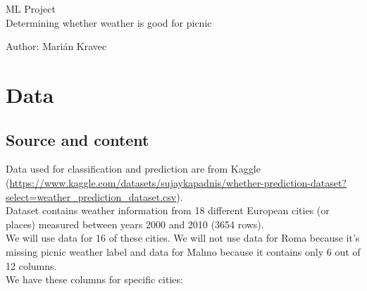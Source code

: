 \documentclass[a4paper]{article}
\begin{document}
 
	
	\pagestyle{plain}
	
	\begin{center}
		\sc\large
		ML Project
		\\
		Determining whether weather is good for picnic 
	\end{center}
	
	Author: Marián Kravec

	\section{Data}
	
	\subsection{Source and content}
	Data used for classification and prediction are from Kaggle (\url{https://www.kaggle.com/datasets/sujaykapadnis/whether-prediction-dataset?select=weather_prediction_dataset.csv}).
	\\
	
	Dataset contains weather information from 18 different European cities (or places) measured between years 2000 and 2010 (3654 rows).
	\\
	
	We will use data for 16 of these cities. We will not use data for Roma because it's missing picnic weather label and data for Malmo because it contains only 6 out of 12 columns.
	\\
	
	We have these columns for specific cities:
	
\end{document}
